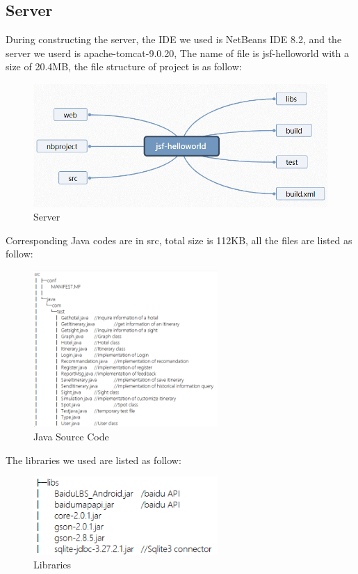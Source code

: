 \documentclass[10pt]{article}
\begin{document}
\subsection{Server}
During constructing the server, the IDE we used is NetBeans IDE 8.2, and the server we userd is apache-tomcat-9.0.20, The name of file is jsf-helloworld with a size of 20.4MB, the file structure of project is as follow:

\begin{figure}[H]
	\centering
	\includegraphics[width=14cm]{server.png}
	\caption{Server}
	\label{Server}
\end{figure}

Corresponding Java codes are in src, total size is 112KB, all the files are listed as follow:

\begin{figure}[H]
	\centering
	\includegraphics[width=7cm]{server_tree.png}
	\caption{Java Source Code}
\end{figure}

The libraries we used are listed as follow:

\begin{figure}[H]
	\centering
	\includegraphics[width=7cm]{lib.png}
	\caption{Libraries}
\end{figure}
\end{document}
